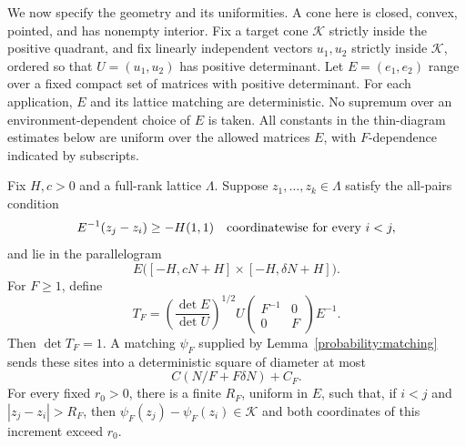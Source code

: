 We now specify the geometry and its uniformities.  A cone here is
closed, convex, pointed, and has nonempty interior.  Fix a target
cone $\mathcal K$ strictly inside the positive quadrant, and fix
linearly independent vectors $u_1,u_2$ strictly inside $\mathcal K$,
ordered so that $U=(u_1,u_2)$ has positive determinant.  Let
$E=(e_1,e_2)$ range over a fixed compact set of matrices with
positive determinant.  For each application, $E$ and its lattice
matching are deterministic.  No supremum over an
environment-dependent choice of $E$ is taken.  All constants in
the thin-diagram estimates below are uniform over the allowed
matrices $E$, with $F$-dependence indicated by subscripts.

\begin{lemma}
\label{probability:thin-geometry}
Fix $H,c>0$ and a full-rank lattice $\Lambda$.  Suppose
$z_1,\ldots,z_k\in\Lambda$ satisfy the all-pairs condition
\begin{equation}
 E^{-1}(z_j-z_i)\ge-H(1,1)
 \quad\hbox{coordinatewise for every }i<j,
 \label{probability:approximate-order}
\end{equation}
and lie in the parallelogram
\begin{equation}
 E\big([-H,cN+H]\times[-H,\delta N+H]\big).
 \label{probability:thin-box}
\end{equation}
For $F\ge1$, define
\[
 T_F=\left(\frac{\det E}{\det U}\right)^{1/2}
          U\begin{pmatrix}F^{-1}&0\\0&F\end{pmatrix}E^{-1}.
\]
Then $\det T_F=1$.  A matching $\psi_F$ supplied by
Lemma~\ref{probability:matching} sends these sites into a
deterministic square of diameter at most
\begin{equation}
             C(N/F+F\delta N)+C_F.
 \label{probability:compressed-size}
\end{equation}
For every fixed $r_0>0$, there is a finite $R_F$, uniform in $E$,
such that, if $i<j$ and $|z_j-z_i|>R_F$, then
$\psi_F(z_j)-\psi_F(z_i)\in\mathcal K$ and both coordinates
of this increment exceed $r_0$.
\end{lemma}

